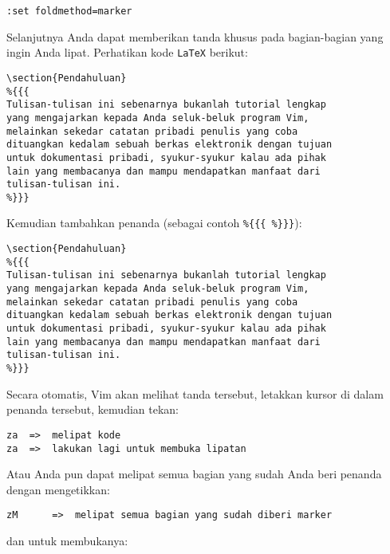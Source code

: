 \documentclass{article}
\begin{document}
\begin{verbatim}
:set foldmethod=marker
\end{verbatim}

Selanjutnya Anda dapat memberikan tanda khusus pada
bagian-bagian yang ingin Anda lipat. Perhatikan kode
\verb=LaTeX= berikut:

\begin{verbatim}
\section{Pendahuluan}
%{{{
Tulisan-tulisan ini sebenarnya bukanlah tutorial lengkap
yang mengajarkan kepada Anda seluk-beluk program Vim,
melainkan sekedar catatan pribadi penulis yang coba
dituangkan kedalam sebuah berkas elektronik dengan tujuan
untuk dokumentasi pribadi, syukur-syukur kalau ada pihak
lain yang membacanya dan mampu mendapatkan manfaat dari
tulisan-tulisan ini.
%}}}
\end{verbatim}

Kemudian tambahkan penanda (sebagai contoh 
\verb=%{{{ %}}}=):

\begin{verbatim}
\section{Pendahuluan}
%{{{
Tulisan-tulisan ini sebenarnya bukanlah tutorial lengkap
yang mengajarkan kepada Anda seluk-beluk program Vim,
melainkan sekedar catatan pribadi penulis yang coba
dituangkan kedalam sebuah berkas elektronik dengan tujuan
untuk dokumentasi pribadi, syukur-syukur kalau ada pihak
lain yang membacanya dan mampu mendapatkan manfaat dari
tulisan-tulisan ini.
%}}}
\end{verbatim}

Secara otomatis, Vim akan melihat tanda tersebut, letakkan
kursor di dalam penanda tersebut, kemudian tekan:

\begin{verbatim}
za  =>  melipat kode
za  =>  lakukan lagi untuk membuka lipatan
\end{verbatim}

Atau Anda pun dapat melipat semua bagian yang sudah Anda
beri penanda dengan mengetikkan:

\begin{verbatim}
zM      =>  melipat semua bagian yang sudah diberi marker
\end{verbatim}

dan untuk membukanya:
\end{document}
